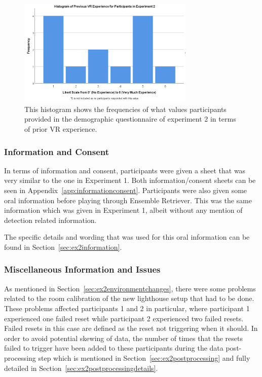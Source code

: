 \begin{figure}[tbph]
    \centering
    \includegraphics[width=0.75\textwidth]{figures/graphs/PriorVRExperienceExperiment2.png}
    \caption[Histogram on Prior VR Experience of Participants in Experiment 2]{This histogram shows the frequencies of what values participants provided in the demographic questionnaire of experiment 2 in terms of prior VR experience.}
    \label{fig:ex2PriorVRExperience}
\end{figure}

\subsubsection{Information and Consent}
In terms of information and consent, participants were given a sheet that was very similar to the one in Experiment 1. Both information/consent sheets can be seen in Appendix~\ref{app:informationconsent}. Participants were also given some oral information before playing through Ensemble Retriever. This was the same information which was given in Experiment 1, albeit without any mention of detection related information. 

The specific details and wording that was used for this oral information can be found in Section~\ref{sec:ex2information}.

\subsubsection{Miscellaneous Information and Issues}
As mentioned in Section~\ref{sec:ex2environmentchanges}, there were some problems related to the room calibration of the new lighthouse setup that had to be done. These problems affected participants 1 and 2 in particular, where participant 1 experienced one failed reset while participant 2 experienced two failed resets. Failed resets in this case are defined as the reset not triggering when it should. In order to avoid potential skewing of data, the number of times that the resets failed to trigger have been added to these participants during the data post-processing step which is mentioned in Section~\ref{sec:ex2postprocessing} and fully detailed in Section~\ref{sec:ex2postprocessingdetails}. 

